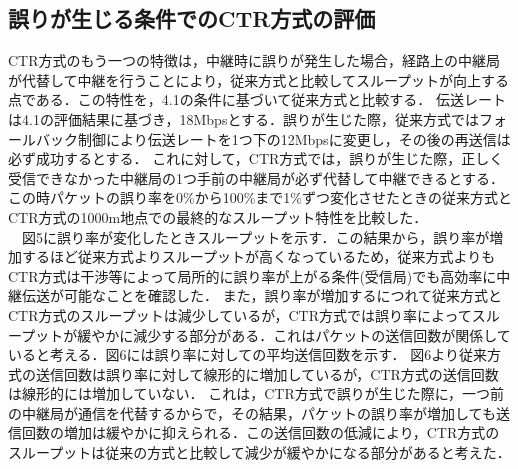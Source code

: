 \documentclass[a4paper,10pt]{ltjsarticle}
\begin{document}
\subsection{誤りが生じる条件でのCTR方式の評価}%
CTR方式のもう一つの特徴は，中継時に誤りが発生した場合，経路上の中継局が代替して中継を行うことにより，従来方式と比較してスループットが向上する点である．この特性を，4.1の条件に基づいて従来方式と比較する．
伝送レートは4.1の評価結果に基づき，18Mbpsとする．誤りが生じた際，従来方式ではフォールバック制御により伝送レートを1つ下の12Mbpsに変更し，その後の再送信は必ず成功するとする．
これに対して，CTR方式では，誤りが生じた際，正しく受信できなかった中継局の1つ手前の中継局が必ず代替して中継できるとする．
この時パケットの誤り率を0\%から100\%まで1\%ずつ変化させたときの従来方式とCTR方式の1000m地点での最終的なスループット特性を比較した．
\\　図5に誤り率が変化したときスループットを示す．この結果から，誤り率が増加するほど従来方式よりスループットが高くなっているため，従来方式よりもCTR方式は干渉等によって局所的に誤り率が上がる条件(受信局)でも高効率に中継伝送が可能なことを確認した．
また，誤り率が増加するにつれて従来方式とCTR方式のスループットは減少しているが，CTR方式では誤り率によってスループットが緩やかに減少する部分がある．これはパケットの送信回数が関係していると考える．図6には誤り率に対しての平均送信回数を示す．
図6より従来方式の送信回数は誤り率に対して線形的に増加しているが，CTR方式の送信回数は線形的には増加していない．
これは，CTR方式で誤りが生じた際に，一つ前の中継局が通信を代替するからで，その結果，パケットの誤り率が増加しても送信回数の増加は緩やかに抑えられる．この送信回数の低減により，CTR方式のスループットは従来の方式と比較して減少が緩やかになる部分があると考えた．
\end{document}
